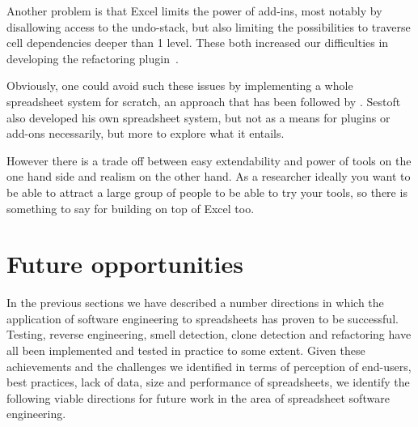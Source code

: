 \documentclass[conference]{IEEEtran}
\begin{document}
Another problem is that Excel limits the power of add-ins, most notably by disallowing access to the undo-stack, but also limiting the possibilities to traverse cell dependencies deeper than 1 level. These both increased our difficulties in developing the refactoring plugin~\cite{hermans_bumblebee:_2014}.

Obviously, one could avoid such these issues by implementing a whole spreadsheet system for scratch, an approach that has been followed by . Sestoft also developed his own spreadsheet system, but not as a means for plugins or add-ons necessarily, but more to explore what it entails.

However there is a trade off between easy extendability and power of tools on the one hand side and realism on the other hand. As a researcher ideally you want to be able to attract a large group of people to be able to try your tools, so there is something to say for building on top of Excel too.

\section{Future opportunities}
In the previous sections we have described a number directions in which the application of software engineering to spreadsheets  has proven to be successful. Testing, reverse engineering, smell detection, clone detection and refactoring have all been implemented and tested in practice to some extent. Given these achievements and the challenges we identified in terms of perception of end-users, best practices, lack of data, size and performance of spreadsheets, we identify the following viable directions for future work in the area of spreadsheet software engineering.

\end{document}
